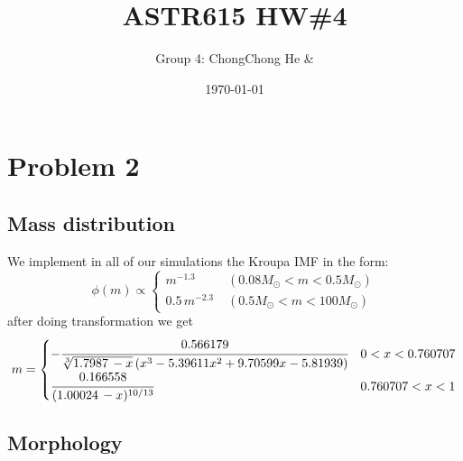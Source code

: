 



\title{ASTR615 HW\#4}
\author{Group 4: ChongChong He \& }
\date{\today}
\maketitle

\section*{Problem 2}
\subsection*{Mass distribution}
We implement in all of our simulations the Kroupa IMF in the form:
\begin{equation}
\phi(m) \propto 
\begin{cases}
m^{-1.3} \; &(0.08M_\odot < m < 0.5M_\odot) \\
0.5 \, m^{-2.3} \; &(0.5M_\odot<m<100M_\odot)
\end{cases}
\end{equation}
after doing transformation we get
\begin{equation}
m=
	\begin{cases}
	-\cfrac{0.566179}{\sqrt[3]{1.7987\, - x} \left(x^3-5.39611 
	x^2+9.70599 x-5.81939\right)} & 0<x<0.760707\\
	\cfrac{0.166558}{(1.00024\, -x)^{10/13}} & 0.760707<x<1
	\end{cases}
\end{equation}

\subsection*{Morphology}


